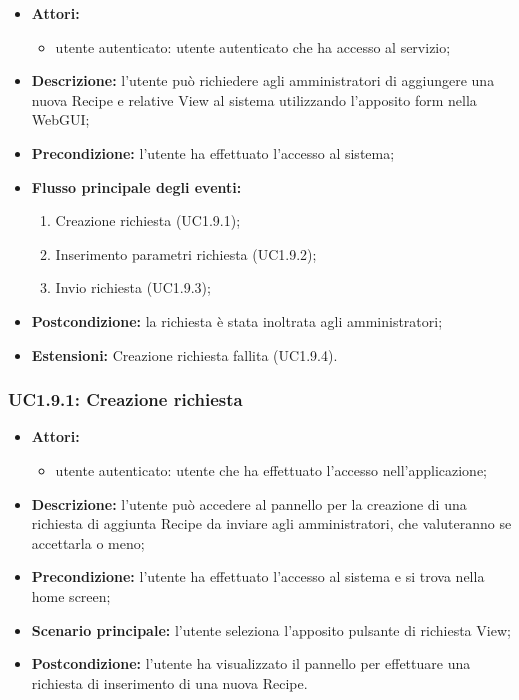 \begin{itemize}
	\item \textbf{Attori:}
	\begin{itemize}
		\item utente autenticato: utente autenticato che ha accesso al servizio;
	\end{itemize}
	\item \textbf{Descrizione:} l'utente può richiedere agli amministratori di aggiungere una nuova Recipe e relative View al sistema utilizzando l'apposito form nella WebGUI;
	\item \textbf{Precondizione:} l'utente ha effettuato l'accesso al sistema;
	\item \textbf{Flusso principale degli eventi:}
	\begin{enumerate}
		\item Creazione richiesta (UC1.9.1);
		\item Inserimento parametri richiesta (UC1.9.2);
		\item Invio richiesta (UC1.9.3);
	\end{enumerate}
	\item \textbf{Postcondizione:} la richiesta è stata inoltrata agli amministratori;
	\item \textbf{Estensioni:} Creazione richiesta fallita (UC1.9.4).
\end{itemize}

\subsubsection{UC1.9.1: Creazione richiesta}
\begin{itemize}
	\item \textbf{Attori:}
	\begin{itemize}
		\item utente autenticato: utente che ha effettuato l'accesso nell'applicazione;
	\end{itemize}
	\item \textbf{Descrizione:} l'utente può accedere al pannello per la creazione di una richiesta di aggiunta Recipe da inviare agli amministratori, che valuteranno se accettarla o meno;
	\item \textbf{Precondizione:} l'utente ha effettuato l'accesso al sistema e si trova nella home screen;
	\item \textbf{Scenario principale:} l'utente seleziona l'apposito pulsante di richiesta View;
	\item \textbf{Postcondizione:} l'utente ha visualizzato il pannello per effettuare una richiesta di inserimento di una nuova Recipe.
\end{itemize}

